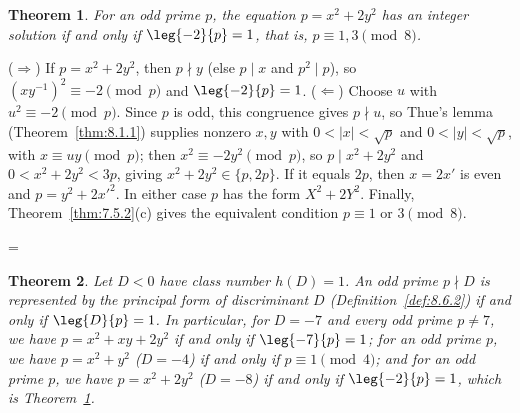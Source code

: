 \documentclass[11pt]{article}
\makeatletter
\theoremstyle{ntstyle}
\newtheorem{theorem}{Theorem}[subsection]
\let\nt@closedisplay\]
\def\nt@guardedclose{\@ifnextchar\par{\nt@closeafterpar}{\@ifnextchar\end{\postdisplaypenalty\@M\nt@closedisplay}{\nt@closedisplay}}}
\def\nt@closeafterpar\par{\@ifnextchar\par{\nt@closeafterpar}{\@ifnextchar\end{\postdisplaypenalty\@M\nt@closedisplay\par}{\nt@closedisplay\par}}}
\renewenvironment{proof}[1][\proofname]{\par
  \pushQED{\qed}\normalfont\topsep\medskipamount\edef\nt@afterproof{\@endparpenalty=\the\@endparpenalty\relax}\@beginparpenalty\@M\@endparpenalty\@M\let\]\nt@guardedclose\trivlist\item[]\textit{#1\@addpunct{.}} \ignorespaces}{\ifvmode\addpenalty\@M\fi\popQED\nt@afterproof\endtrivlist\@endpefalse}
\makeatother
\begin{document}
\begin{theorem}\label{thm:8.6.4} For an
	odd prime $p$, the equation $p = x^2 + 2y^2$ has an integer solution
	if and only if $\leg{-2}{p} = 1$, that is, $p \equiv 1, 3 \pmod{8}$.

\end{theorem}

\begin{proof} ($\Rightarrow$) If $p = x^2 + 2y^2$, then $p
		\nmid y$ (else $p \mid x$ and $p^2 \mid p$), so $(xy^{-1})^2 \equiv
		-2 \pmod{p}$ and $\leg{-2}{p} = 1$. ($\Leftarrow$)
	Choose $u$ with $u^2 \equiv -2 \pmod{p}$. Since $p$ is odd, this
	congruence gives $p\nmid u$, so Thue's lemma
	(Theorem~\ref{thm:8.1.1}) supplies nonzero $x,y$ with
	$0<|x|<\sqrt{p}$ and $0<|y|<\sqrt{p}$, with
	$x \equiv u y \pmod{p}$; then $x^2 \equiv -2y^2 \pmod{p}$, so $p \mid
		x^2 + 2y^2$ and $0 < x^2 + 2y^2 < 3p$, giving $x^2 + 2y^2 \in \{p,
		2p\}$. If it equals $2p$, then $x = 2x'$ is even and $p = y^2 +
		2x'^2$. In either case $p$ has the form $X^2 + 2Y^2$. Finally,
	Theorem~\ref{thm:7.5.2}(c) gives the equivalent condition
	$p\equiv1$ or $3\pmod{8}$.

\end{proof}
\begin{theorem}\label{thm:8.6.5} Let $D < 0$ have class
	number $h(D) = 1$. An odd
	prime $p \nmid D$ is represented by the principal form of
	discriminant $D$ (Definition~\ref{def:8.6.2}) if and only if $\leg{D}{p} = 1$. In
	particular, for $D=-7$ and every odd prime $p\neq7$, we have
	$p=x^2+xy+2y^2$ if and only if $\leg{-7}{p}=1$;
	for an odd prime $p$, we have $p = x^2 + y^2$ ($D = -4$) if and only if $p \equiv 1
		\pmod{4}$; and for an odd prime $p$, we have $p = x^2 + 2y^2$ ($D = -8$) if and
	only if $\leg{-2}{p} = 1$, which is Theorem~\ref{thm:8.6.4}.

\end{theorem}
\end{document}
